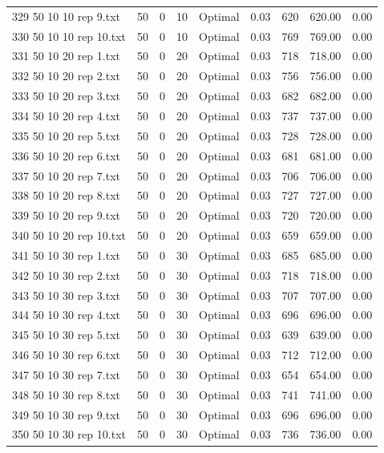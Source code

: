 \begin{longtable}{lrrllrrrr}
329 50 10 10 rep 9.txt & 50 & 0 & 10 & Optimal &  0.03 & 620 & 620.00 &  0.00\\
330 50 10 10 rep 10.txt & 50 & 0 & 10 & Optimal &  0.03 & 769 & 769.00 &  0.00\\
331 50 10 20 rep 1.txt & 50 & 0 & 20 & Optimal &  0.03 & 718 & 718.00 &  0.00\\
332 50 10 20 rep 2.txt & 50 & 0 & 20 & Optimal &  0.03 & 756 & 756.00 &  0.00\\
333 50 10 20 rep 3.txt & 50 & 0 & 20 & Optimal &  0.03 & 682 & 682.00 &  0.00\\
334 50 10 20 rep 4.txt & 50 & 0 & 20 & Optimal &  0.03 & 737 & 737.00 &  0.00\\
335 50 10 20 rep 5.txt & 50 & 0 & 20 & Optimal &  0.03 & 728 & 728.00 &  0.00\\
336 50 10 20 rep 6.txt & 50 & 0 & 20 & Optimal &  0.03 & 681 & 681.00 &  0.00\\
337 50 10 20 rep 7.txt & 50 & 0 & 20 & Optimal &  0.03 & 706 & 706.00 &  0.00\\
338 50 10 20 rep 8.txt & 50 & 0 & 20 & Optimal &  0.03 & 727 & 727.00 &  0.00\\
339 50 10 20 rep 9.txt & 50 & 0 & 20 & Optimal &  0.03 & 720 & 720.00 &  0.00\\
340 50 10 20 rep 10.txt & 50 & 0 & 20 & Optimal &  0.03 & 659 & 659.00 &  0.00\\
341 50 10 30 rep 1.txt & 50 & 0 & 30 & Optimal &  0.03 & 685 & 685.00 &  0.00\\
342 50 10 30 rep 2.txt & 50 & 0 & 30 & Optimal &  0.03 & 718 & 718.00 &  0.00\\
343 50 10 30 rep 3.txt & 50 & 0 & 30 & Optimal &  0.03 & 707 & 707.00 &  0.00\\
344 50 10 30 rep 4.txt & 50 & 0 & 30 & Optimal &  0.03 & 696 & 696.00 &  0.00\\
345 50 10 30 rep 5.txt & 50 & 0 & 30 & Optimal &  0.03 & 639 & 639.00 &  0.00\\
346 50 10 30 rep 6.txt & 50 & 0 & 30 & Optimal &  0.03 & 712 & 712.00 &  0.00\\
347 50 10 30 rep 7.txt & 50 & 0 & 30 & Optimal &  0.03 & 654 & 654.00 &  0.00\\
348 50 10 30 rep 8.txt & 50 & 0 & 30 & Optimal &  0.03 & 741 & 741.00 &  0.00\\
349 50 10 30 rep 9.txt & 50 & 0 & 30 & Optimal &  0.03 & 696 & 696.00 &  0.00\\
350 50 10 30 rep 10.txt & 50 & 0 & 30 & Optimal &  0.03 & 736 & 736.00 &  0.00\\

\end{longtable}
